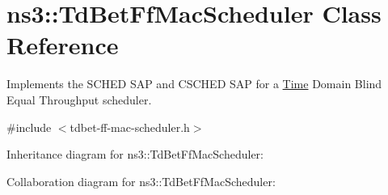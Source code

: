 \hypertarget{classns3_1_1TdBetFfMacScheduler}{}\section{ns3\+:\+:Td\+Bet\+Ff\+Mac\+Scheduler Class Reference}
\label{classns3_1_1TdBetFfMacScheduler}


Implements the S\+C\+H\+ED S\+AP and C\+S\+C\+H\+ED S\+AP for a \hyperlink{classns3_1_1Time}{Time} Domain Blind Equal Throughput scheduler.  




{\ttfamily \#include $<$tdbet-\/ff-\/mac-\/scheduler.\+h$>$}



Inheritance diagram for ns3\+:\+:Td\+Bet\+Ff\+Mac\+Scheduler\+:


Collaboration diagram for ns3\+:\+:Td\+Bet\+Ff\+Mac\+Scheduler\+:
